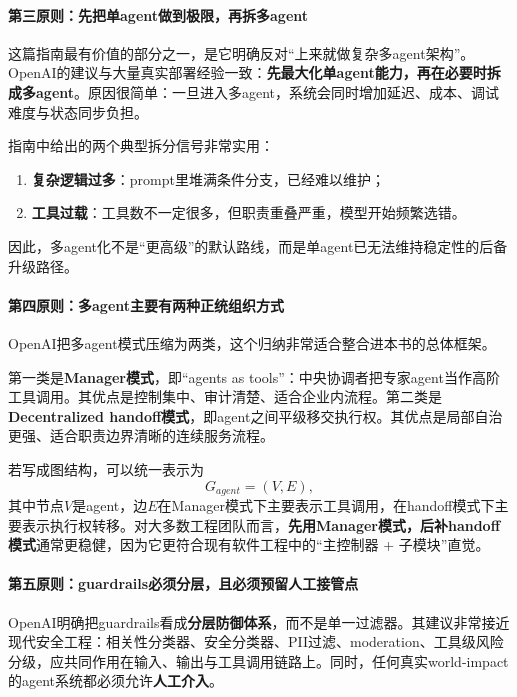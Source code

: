 \documentclass[12pt,a4paper]{article}
\begin{document}
\paragraph{第三原则：先把单agent做到极限，再拆多agent}

这篇指南最有价值的部分之一，是它明确反对“上来就做复杂多agent架构”。OpenAI的建议与大量真实部署经验一致：\textbf{先最大化单agent能力，再在必要时拆成多agent}。原因很简单：一旦进入多agent，系统会同时增加延迟、成本、调试难度与状态同步负担。

指南中给出的两个典型拆分信号非常实用：
\begin{enumerate}
    \item \textbf{复杂逻辑过多}：prompt里堆满条件分支，已经难以维护；
    \item \textbf{工具过载}：工具数不一定很多，但职责重叠严重，模型开始频繁选错。
\end{enumerate}
因此，多agent化不是“更高级”的默认路线，而是单agent已无法维持稳定性的后备升级路径。

\paragraph{第四原则：多agent主要有两种正统组织方式}

OpenAI把多agent模式压缩为两类，这个归纳非常适合整合进本书的总体框架。

第一类是\textbf{Manager模式}，即“agents as tools”：中央协调者把专家agent当作高阶工具调用。其优点是控制集中、审计清楚、适合企业内流程。第二类是\textbf{Decentralized handoff模式}，即agent之间平级移交执行权。其优点是局部自治更强、适合职责边界清晰的连续服务流程。

若写成图结构，可以统一表示为
\begin{equation}
G_{agent} = (V, E),
\end{equation}
其中节点$V$是agent，边$E$在Manager模式下主要表示工具调用，在handoff模式下主要表示执行权转移。对大多数工程团队而言，\textbf{先用Manager模式，后补handoff模式}通常更稳健，因为它更符合现有软件工程中的“主控制器 + 子模块”直觉。

\paragraph{第五原则：guardrails必须分层，且必须预留人工接管点}

OpenAI明确把guardrails看成\textbf{分层防御体系}，而不是单一过滤器。其建议非常接近现代安全工程：相关性分类器、安全分类器、PII过滤、moderation、工具级风险分级，应共同作用在输入、输出与工具调用链路上。同时，任何真实world-impact的agent系统都必须允许\textbf{人工介入}。
\end{document}
